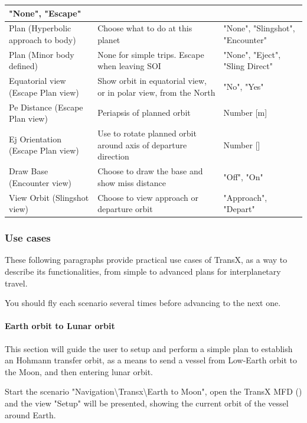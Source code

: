 \documentclass[Orbiter User Manual.tex]{subfiles}
\begin{document}
\begin{longtable}{ >{\RaggedRight}p{}
		>{\RaggedRight}p{} >{\RaggedRight}p{} }
		"None", "Escape"\\
	\hline
	Plan (Hyperbolic approach to body) & Choose what to do at this planet &
		"None", "Slingshot", "Encounter"\\
	\hline
	Plan (Minor body defined) & None for simple trips. Escape when leaving SOI &
		"None", "Eject", "Sling Direct"\\
	\hline
	Equatorial view (Escape Plan view) & Show orbit in equatorial view, or in
		polar view, from the North & "No", "Yes"\\
	\hline
	Pe Distance (Escape Plan view) & Periapsis of planned orbit & Number [m]\\
	\hline
	Ej Orientation (Escape Plan view) & Use to rotate planned orbit around axis
		of departure direction & Number [\deg]\\
	\hline
	Draw Base (Encounter view) & Choose to draw the base and show miss distance
		& "Off", "On"\\
	\hline
	View Orbit (Slingshot view) & Choose to view approach or departure orbit &
		"Approach", "Depart"\\
	\hline
	\end{longtable}


\subsubsection{Use cases}
These following paragraphs provide practical use cases of TransX, as a way to
describe its functionalities, from simple to advanced plans for interplanetary
travel.

You should fly each scenario several times before advancing to the next one.

\paragraph{Earth orbit to Lunar orbit}
This section will guide the user to setup and perform a simple plan to establish
an Hohmann transfer orbit, as a means to send a vessel from Low-Earth orbit to
the Moon, and then entering lunar orbit.

Start the scenario "Navigation\textbackslash Transx\textbackslash Earth to
Moon", open the TransX MFD () and the view "Setup" will be presented,
showing the current orbit of the vessel around Earth.
\end{document}
